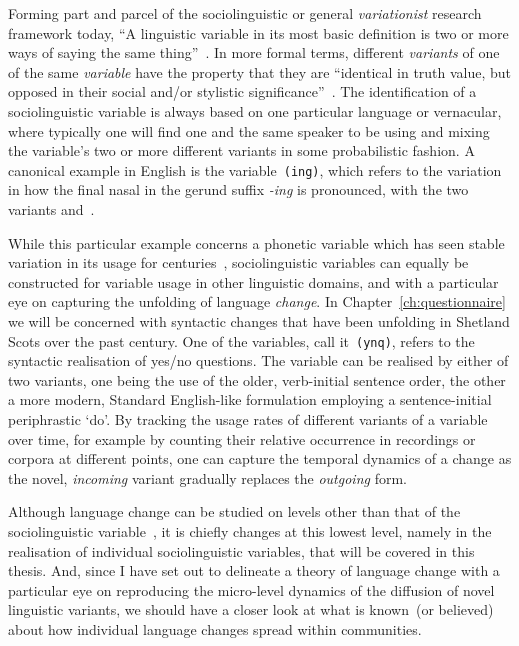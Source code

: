 Forming part and parcel of the sociolinguistic or general \emph{variationist} research framework today,
``A linguistic variable in its most basic definition is two or more ways of saying the same thing''~\citep[p.4]{Tagliamonte2012}.
In more formal terms, different \emph{variants} of one of the same \emph{variable} have the property that they are ``identical in truth value, but opposed in their social and/or stylistic significance''~\citep[p.271]{Labov1972}. %
The identification of a sociolinguistic variable is always based on one particular language or vernacular, where typically one will find one and the same speaker to be using and mixing the variable's two or more different variants in some probabilistic fashion. A canonical example in English is the variable~\texttt{(ing)}, which refers to the variation in how the final nasal in the gerund suffix \emph{-ing} is pronounced, with the two variants \textipa{[n]} and~\textipa{[N]}.

While this particular example concerns a phonetic variable which has seen stable variation in its usage for centuries~\citep{Labov1989}, sociolinguistic variables can equally be constructed for variable usage in other linguistic domains, and with a particular eye on capturing the unfolding of language \emph{change}. In Chapter~\ref{ch:questionnaire} we will be concerned with syntactic changes that have been unfolding in Shetland Scots over the past century. One of the variables, call it~\texttt{(ynq)}, refers to the syntactic realisation of yes/no questions. The variable can be realised by either of two variants, one being the use of the older, verb-initial sentence order, the other a more modern, Standard English-like formulation employing a sentence-initial periphrastic `do'. By tracking the usage rates of different variants of a variable over time, for example by counting their relative occurrence in recordings or corpora at different points, one can capture the temporal dynamics of a change as the novel, \emph{incoming} variant gradually replaces the \emph{outgoing} form.


Although language change can be studied on levels other than that of the sociolinguistic variable~\citep[see in particular][p.98]{Croft2006}, it is chiefly changes at this lowest level, namely in the realisation of individual sociolinguistic variables, that will be covered in this thesis. And, since I have set out to delineate a theory of language change with a particular eye on reproducing the micro-level dynamics of the diffusion of novel linguistic variants, we should have a closer look at what is known~(or believed) about how individual language changes spread within communities.

